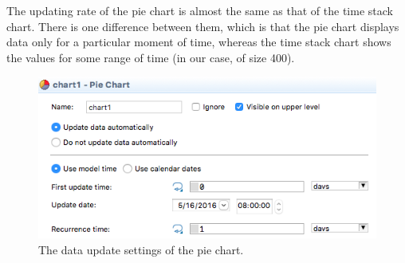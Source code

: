 The updating rate of the pie chart is almost the same as that of the time stack chart. There is one difference between them, which is that the pie chart displays data only for a particular moment of time, whereas the time stack chart shows the values for some range of time (in our case, of size 400).

\begin{figure}[H]
  \centering
  \includegraphics[height=0.3\textwidth]{img/screens/charts/charts6}
  \caption{The data update settings of the pie chart.}
\end{figure}